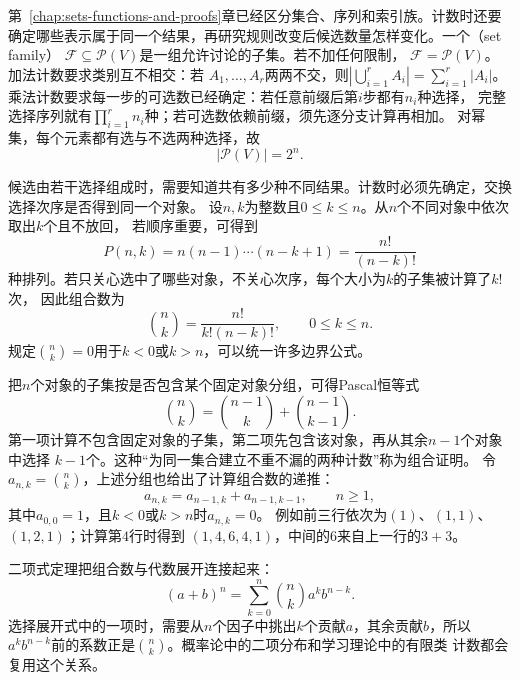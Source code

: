 第~\ref{chap:sets-functions-and-proofs}章已经区分集合、序列和索引族。计数时还要
确定哪些表示属于同一个结果，再研究规则改变后候选数量怎样变化。一个（set family）
$\mathcal{F}\subseteq\mathcal{P}(V)$是一组允许讨论的子集。若不加任何限制，
$\mathcal{F}=\mathcal{P}(V)$。加法计数要求类别互不相交：若
$A_1,\ldots,A_r$两两不交，则$|\bigcup_{i=1}^r A_i|=\sum_{i=1}^r|A_i|$。
乘法计数要求每一步的可选数已经确定：若任意前缀后第$i$步都有$n_i$种选择，
完整选择序列就有$\prod_{i=1}^r n_i$种；若可选数依赖前缀，须先逐分支计算再相加。
对幂集，每个元素都有选与不选两种选择，故
\begin{equation}
  |\mathcal{P}(V)|=2^n.
  \label{eq:comb-power-set-count}
\end{equation}

候选由若干选择组成时，需要知道共有多少种不同结果。计数时必须先确定，交换选择次序是否得到同一个对象。
设$n,k$为整数且$0\leq k\leq n$。从$n$个不同对象中依次取出$k$个且不放回，
若顺序重要，可得到
\[
  P(n,k)=n(n-1)\cdots(n-k+1)=\frac{n!}{(n-k)!}
\]
种排列。若只关心选中了哪些对象，不关心次序，每个大小为$k$的子集被计算了$k!$次，
因此组合数为
\begin{equation}
  \binom{n}{k}=\frac{n!}{k!(n-k)!},
  \qquad 0\leq k\leq n.
  \label{eq:prelim-binomial-coefficient}
\end{equation}
规定$\binom{n}{k}=0$用于$k<0$或$k>n$，可以统一许多边界公式。

把$n$个对象的子集按是否包含某个固定对象分组，可得Pascal恒等式
\[
  \binom{n}{k}
  =
  \binom{n-1}{k}
  +
  \binom{n-1}{k-1}.
\]
第一项计算不包含固定对象的子集，第二项先包含该对象，再从其余$n-1$个对象中选择
$k-1$个。这种“为同一集合建立不重不漏的两种计数”称为组合证明。
令$a_{n,k}=\binom nk$，上述分组也给出了计算组合数的递推：
\begin{equation}
  a_{n,k}=a_{n-1,k}+a_{n-1,k-1},
  \qquad n\geq1,
  \label{eq:comb-binomial-recurrence}
\end{equation}
其中$a_{0,0}=1$，且$k<0$或$k>n$时$a_{n,k}=0$。
例如前三行依次为$(1)$、$(1,1)$、$(1,2,1)$；计算第$4$行时得到
$(1,4,6,4,1)$，中间的$6$来自上一行的$3+3$。

二项式定理把组合数与代数展开连接起来：
\begin{equation}
  (a+b)^n
  =
  \sum_{k=0}^{n}\binom{n}{k}a^k b^{n-k}.
  \label{eq:prelim-binomial-theorem}
\end{equation}
选择展开式中的一项时，需要从$n$个因子中挑出$k$个贡献$a$，其余贡献$b$，所以
$a^k b^{n-k}$前的系数正是$\binom{n}{k}$。概率论中的二项分布和学习理论中的有限类
计数都会复用这个关系。

